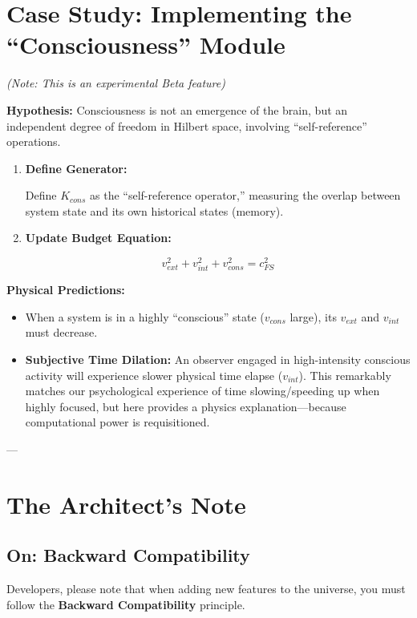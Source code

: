 \documentclass[11pt,a4paper,twoside]{book}
\begin{document}
\section{Case Study: Implementing the ``Consciousness'' Module}

\textit{(Note: This is an experimental Beta feature)}

\textbf{Hypothesis:} Consciousness is not an emergence of the brain, but an independent degree of freedom in Hilbert space, involving ``self-reference'' operations.

\begin{enumerate}
\item \textbf{Define Generator:}

Define \textbf{$K_{cons}$} as the ``self-reference operator,'' measuring the overlap between system state and its own historical states (memory).

\item \textbf{Update Budget Equation:}

$$v_{ext}^2 + v_{int}^2 + v_{cons}^2 = c_{FS}^2$$
\end{enumerate}

\textbf{Physical Predictions:}

\begin{itemize}
\item When a system is in a highly ``conscious'' state (\textbf{$v_{cons}$} large), its \textbf{$v_{ext}$} and \textbf{$v_{int}$} must decrease.

\item \textbf{Subjective Time Dilation:} An observer engaged in high-intensity conscious activity will experience slower physical time elapse ($v_{int}$). This remarkably matches our psychological experience of time slowing/speeding up when highly focused, but here provides a physics explanation---because computational power is requisitioned.
\end{itemize}

---

\section{The Architect's Note}

\subsection{On: Backward Compatibility}

Developers, please note that when adding new features to the universe, you must follow the \textbf{Backward Compatibility} principle.
\end{document}
